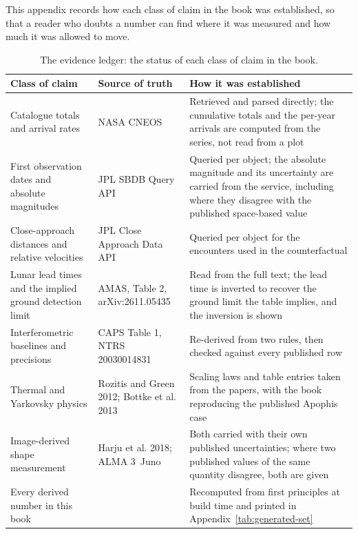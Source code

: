 This appendix records how each class of claim in the book was established,
so that a reader who doubts a number can find where it was measured and how
much it was allowed to move.

\begin{table}[!htbp]
\centering
\small
\caption{The evidence ledger: the status of each class of claim in the book.}
\label{tab:evidence-ledger}
\begin{tabularx}{\textwidth}{@{}P{1.21in}P{1.35in}Y@{}}
\toprule
{}
\textbf{Class of claim} & \textbf{Source of truth} & \textbf{How it was established} \\
\midrule
Catalogue totals and arrival rates &
NASA CNEOS  &
Retrieved and parsed directly; the cumulative totals and the per-year
arrivals are computed from the series, not read from a plot \\
\addlinespace[2pt]
First observation dates and absolute magnitudes &
JPL SBDB Query API &
Queried per object; the absolute magnitude and its uncertainty are carried
from the service, including where they disagree with the published
space-based value \\
\addlinespace[2pt]
Close-approach distances and relative velocities &
JPL Close Approach Data API &
Queried per object for the encounters used in the counterfactual \\
\addlinespace[2pt]
Lunar lead times and the implied ground detection limit &
AMAS, Table 2, arXiv:2611.05435 &
Read from the full text; the lead time is inverted to recover the ground
limit the table implies, and the inversion is shown \\
\addlinespace[2pt]
Interferometric baselines and precisions &
CAPS Table 1, NTRS 20030014831 &
Re-derived from two rules, then checked against every published row \\
\addlinespace[2pt]
Thermal and Yarkovsky physics &
Rozitis and Green 2012; Bottke et al. 2013 &
Scaling laws and table entries taken from the papers, with the book
reproducing the published Apophis case \\
\addlinespace[2pt]
Image-derived shape measurement &
Harju et al. 2018; ALMA 3~Juno &
Both carried with their own published uncertainties; where two published
values of the same quantity disagree, both are given \\
\addlinespace[2pt]
Every derived number in this book &
 &
Recomputed from first principles at build time and printed in
Appendix~\ref{tab:generated-set} \\
\bottomrule
\end{tabularx}
\end{table}

